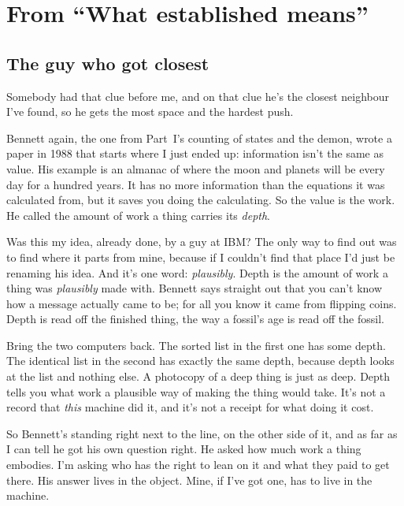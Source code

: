 \documentclass[11pt,twoside]{article}
\theoremstyle{thielethm}
\theoremstyle{thieledef}
\theoremstyle{thieledef}
\theoremstyle{thieledef}
\theoremstyle{thielethm}
\theoremstyle{thieleobs}
\theoremstyle{thielethm}
\begin{document}
\section{From ``What established means''}

\subsection{The guy who got closest}

Somebody had that clue before me, and on that clue he's the closest neighbour I've found, so he gets the most space
and the hardest push.

Bennett again, the one from Part~I's counting of states and the demon, wrote a paper in 1988 that starts where I just ended up:
information isn't the same as value. His example is an almanac of where the moon and planets will
be every day for a hundred years. It has no more information than the equations it was calculated
from, but it saves you doing the calculating. So the value is the work. He called the amount of
work a thing carries its \emph{depth}.

Was this my idea, already done, by a guy at IBM? The only way to find out was to find where it
parts from mine, because if I couldn't find that place I'd just be renaming his idea. And it's one
word: \emph{plausibly}. Depth is the amount of work a thing was \emph{plausibly} made with. Bennett says
straight out that you can't know how a message actually came to be; for all you know it came from
flipping coins. Depth is read off the finished thing, the way a fossil's age is read off the
fossil.

Bring the two computers back. The sorted list in the first one has some depth. The identical list in
the second has exactly the same depth, because depth looks at the list and nothing else. A
photocopy of a deep thing is just as deep. Depth tells you what work a plausible way of making the thing would take.
It's not a record that \emph{this} machine did it, and it's not a receipt for what doing it
cost.

So Bennett's standing right next to the line, on the other side of it, and as far as I can tell he
got his own question right. He asked how much work a thing embodies. I'm asking who has the right to
lean on it and what they paid to get there. His answer lives in the object. Mine, if I've got one,
has to live in the machine.
\end{document}
